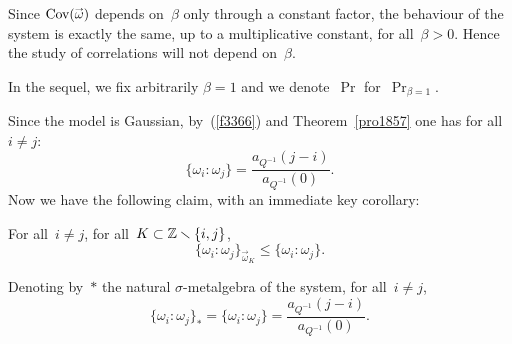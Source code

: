 \begin{Rmk}
Since $\Cov(\vec\omega)$ depends on~$\beta$ only through a constant factor,
the behaviour of the system is exactly the same, up to a multiplicative constant,
for all~$\beta > 0$. Hence the study of correlations will not depend on~$\beta$.
\end{Rmk}

\begin{NOTA}
In the sequel, we fix arbitrarily $\beta = 1$ and we denote~$\Pr$ for~$\Pr_{\beta=1}$.
\end{NOTA}

Since the model is Gaussian, by~(\ref{f3366}) and Theorem~\ref{pro1857}
one has for all~$i \neq j$:
\[ \{ \omega_i : \omega_j \} = \frac{a_{Q^{-1}}(j-i)}{a_{Q^{-1}}(0)} .\]
Now we have the following claim, with an immediate key corollary:
\begin{Clm}\label{l3475}
For all~$i\neq j$, for all~$K \subset \mathbb{Z}\smallsetminus\{i,j\}$,
\[ \{ \omega_i : \omega_j \}_{\vec\omega_K} \leq \{ \omega_i : \omega_j \} .\]
\end{Clm}

\begin{Cor}\label{c6834}
Denoting by~$*$ the natural $\sigma$-metalgebra of the system, for all~$i\neq j$,
\[\label{fc6834} \{ \omega_i : \omega_j \}_* = \{ \omega_i : \omega_j \}
= \frac{a_{Q^{-1}}(j-i)}{a_{Q^{-1}}(0)} .\]
\end{Cor}

